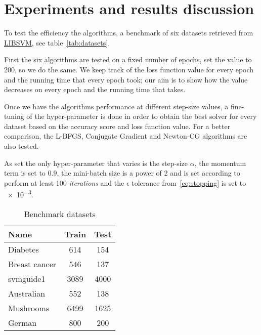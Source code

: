 \section{Experiments and results discussion}\label{sc:exp}




To test the efficiency the algorithms, a benchmark of six datasets retrieved from \href{https://www.csie.ntu.edu.tw/~cjlin/libsvmtools/datasets/}{LIBSVM}, see table~\vref{tab:datasets}.

First the six algorithms are tested on a fixed number of epochs, \textcite{fan_msl_2023} set the value to \num{200}, so we do the same. We keep track of the loss function value for every epoch and the running time that every epoch took; our aim is to show how the value decreases on every epoch and the running time that takes.

Once we have the algorithms performance at different step-size values, a fine-tuning of the hyper-parameter is done in order to obtain the best solver for every dataset based on the accuracy score and loss function value. For a better comparison, the L-BFGS, Conjugate Gradient and Newton-CG algorithms are also tested.

As set the only hyper-parameter that varies is the step-size $\alpha$, the momentum term is set to \num{0.9}, the mini-batch size is a power of 2 and is set according to perform at least \num{100} \emph{iterations} and the $\epsilon$ tolerance from~\eqref{eq:stopping} is set to \num{e-3}.

\begin{table}
\centering
\caption{Benchmark datasets}
\label{tab:datasets}
\begin{tabular}{lSS}
\toprule
Name & {Train} & {Test} \\
\midrule
Diabetes & 614 & 154 \\
Breast cancer & 546 & 137 \\
svmguide1 & 3089 & 4000 \\
Australian & 552 & 138 \\
Mushrooms & 6499 & 1625 \\
German & 800 & 200 \\
\bottomrule
\end{tabular}
\end{table}


